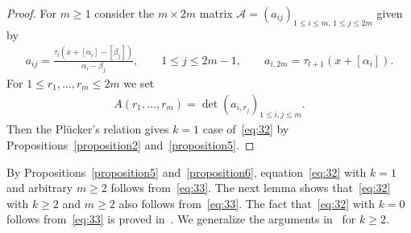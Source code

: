 \documentclass[pdftex]{sigma}
\begin{document}
\begin{proof}
For $m\ge1$ consider the $m\times2m$ matrix ${\mathcal A}=(a_{ij})_{1\le i\le m,\,1\le j\le2m}$ given by
\begin{gather*}%
a_{ij}=\frac{\tau_l(x+[\alpha_i]-[\beta_j])}{\alpha_i-\beta_j},\qquad 1\le j\le2m-1,
\qquad
a_{i,2m}=\tau_{l+1}(x+[\alpha_i]).
\end{gather*}
For $1\le r_1,\dots,r_m\le2m$ we set
\begin{gather*}
A(r_1,\dots,r_m)=\det(a_{i,{r_j}})_{1\le i,j\le m}.
\end{gather*}
Then the Pl\"{u}cker's relation gives $k=1$ case of~\eqref{eq:32} by Propositions~\ref{proposition2} and~\ref{proposition5}.
\end{proof}

 {\sloppy By Propositions~\ref{proposition5} and~\ref{proposition6}, equation~\eqref{eq:32} with $k=1$ and arbitrary $m\ge2$ follows
from~\eqref{eq:33}.
The next lemma shows that~\eqref{eq:32} with $k\ge2$ and $m\ge2$ also follows from~\eqref{eq:33}.
The fact that~\eqref{eq:32} with $k=0$ follows from~\eqref{eq:33} is proved in~\cite{NT1}.
We generalize the arguments in~\cite{NT1} for $k\ge2$.

}
\end{document}
